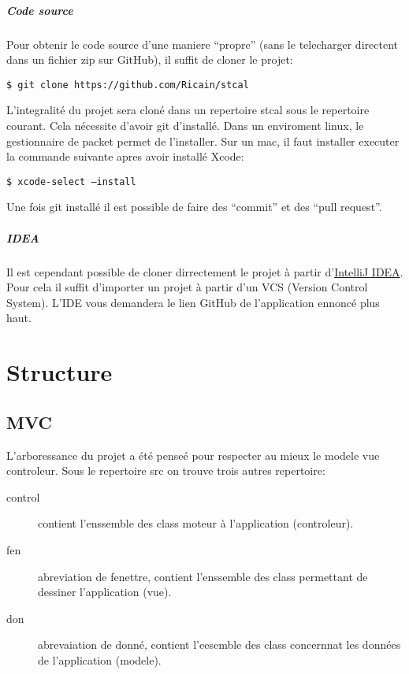 \documentclass[a4paper,10pt]{report}
\newcommand{\code}[1]{\texttt{#1}}
\begin{document}
			\paragraph[Code source]{Code source}
			Pour obtenir le code source d'une maniere ``propre'' (sans le telecharger directent dans un fichier zip sur GitHub), il suffit de cloner le projet:

			\code{\$ git clone https://github.com/Ricain/stcal}

			L'integralité du projet sera cloné dans un repertoire stcal sous le repertoire courant. Cela nécessite d'avoir git d'installé. Dans un enviroment linux, le gestionnaire de packet permet de l'installer. Sur un mac, il faut installer executer la commande suivante apres avoir installé Xcode:

			\code{\$ xcode-select --install}

			Une fois git installé il est possible de faire des ``commit'' et des ``pull request''.

			\paragraph[IDEA]{IDEA}
			Il est cependant possible de cloner dirrectement le projet à partir d'\href{http://www.jetbrains.com/idea/}{IntelliJ IDEA}. Pour cela il suffit d'importer un projet à partir d'un VCS (Version Control System). L'IDE vous demandera le lien GitHub de l'application ennoncé plus haut.

\chapter{Structure}

	\section{MVC}

	L'arboressance du projet a été penseé pour respecter au mieux le modele vue controleur. Sous le repertoire src on trouve trois autres repertoire:
	\begin{description}
		\item[control] contient l'enssemble des class moteur à l'application (controleur).
		\item[fen] abreviation de fenettre, contient l'enssemble des class permettant de dessiner l'application (vue).
		\item[don] abrevaiation de donné, contient l'eesemble des class concernnat les données de l'application (modele).
	\end{description}
\end{document}
